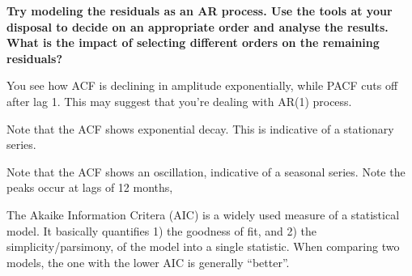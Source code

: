 \item \textbf{Try modeling the residuals as an AR process. Use the tools at your disposal to decide on an appropriate order and analyse the results. What is the impact of selecting different orders on the remaining residuals?}

You see how ACF is declining in amplitude exponentially, while PACF cuts off after lag 1. This may suggest that you're dealing with AR(1) process.

Note that the ACF shows exponential decay. This is indicative of a stationary series.

Note that the ACF shows an oscillation, indicative of a seasonal series. Note the peaks occur at lags of 12 months, 

The Akaike Information Critera (AIC) is a widely used measure of a statistical model. It basically quantifies 1) the goodness of fit, and 2) the simplicity/parsimony, of the model into a single statistic. When comparing two models, the one with the lower AIC is generally “better”.